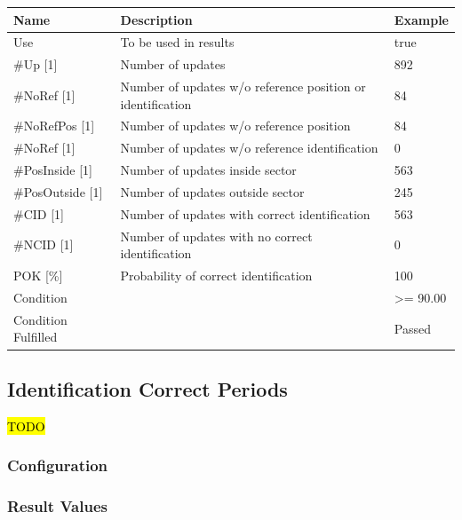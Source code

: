 \begin{center}
 \begin{table}[H]
  \begin{tabularx}{\textwidth}{ | l | X |  l | }
    \hline
    \textbf{Name} & \textbf{Description} & \textbf{Example} \\ \hline
    Use & To be used in results & true \\ \hline
    \#Up [1] & Number of updates & 892 \\ \hline
    \#NoRef [1] & Number of updates w/o reference position or identification & 84 \\ \hline
    \#NoRefPos [1] & Number of updates w/o reference position  & 84 \\ \hline
    \#NoRef [1] & Number of updates w/o reference identification & 0 \\ \hline
    \#PosInside [1] & Number of updates inside sector & 563 \\ \hline
    \#PosOutside [1] & Number of updates outside sector & 245 \\ \hline
    \#CID [1] & Number of updates with correct identification & 563 \\ \hline
    \#NCID [1] & Number of updates with no correct identification & 0 \\ \hline
    POK [\%] & Probability of correct identification & 100 \\ \hline
    Condition &  & >= 90.00 \\ \hline
    Condition Fulfilled &  & Passed \\ \hline
\end{tabularx}
\end{table}
\end{center}

\subsection{Identification Correct Periods}
\label{sec:eval_req_id_correct_periods} 

\hl{TODO}

\subsubsection{Configuration}

\subsubsection{Result Values}

